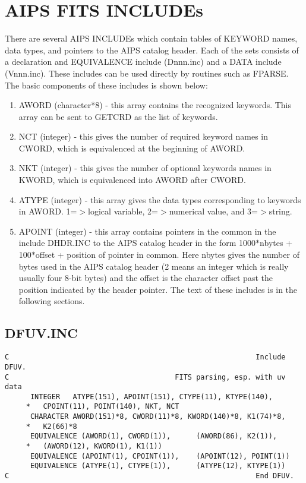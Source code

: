 \section{AIPS FITS INCLUDEs }
There are several AIPS INCLUDEs which contain tables of KEYWORD names,
data types, and pointers to the AIPS catalog header.  Each of the sets
consists of a declaration and EQUIVALENCE include (Dnnn.inc) and a
DATA include (Vnnn.inc).  These includes can be used directly by
routines such as FPARSE.  The basic components of these includes is
shown below:
\begin{enumerate} %
\item AWORD (character*8) - this array contains the recognized
keywords.  This array can be sent to GETCRD as the list of keywords.
\item NCT (integer) - this gives the number of required keyword names in CWORD,
which is equivalenced at the beginning of AWORD.
\item NKT (integer) - this gives the number of optional keywords names in
KWORD, which is equivalenced into AWORD after CWORD.
\item ATYPE (integer) - this array gives the data types corresponding to
keywords in AWORD. 1=$>$logical variable, 2=$>$numerical value, and
3=$>$string.
\item APOINT (integer) - this array contains pointers in the common in the
include DHDR.INC to the AIPS catalog header in the form
1000$\ast$nbytes + 100$\ast$offset + position of pointer in common.  Here
nbytes gives the number of bytes used in the AIPS catalog header (2
means an integer which is really usually four 8-bit bytes) and
the offset is the character offset past the position indicated by the
header pointer.  The text of these includes is in the following
sections.

\end{enumerate} %
\subsection{DFUV.INC}

\begin{verbatim}
C                                                          Include DFUV.
C                                       FITS parsing, esp. with uv data
      INTEGER   ATYPE(151), APOINT(151), CTYPE(11), KTYPE(140),
     *   CPOINT(11), POINT(140), NKT, NCT
      CHARACTER AWORD(151)*8, CWORD(11)*8, KWORD(140)*8, K1(74)*8,
     *   K2(66)*8
      EQUIVALENCE (AWORD(1), CWORD(1)),      (AWORD(86), K2(1)),
     *   (AWORD(12), KWORD(1), K1(1))
      EQUIVALENCE (APOINT(1), CPOINT(1)),    (APOINT(12), POINT(1))
      EQUIVALENCE (ATYPE(1), CTYPE(1)),      (ATYPE(12), KTYPE(1))
C                                                          End DFUV.

\end{verbatim}
